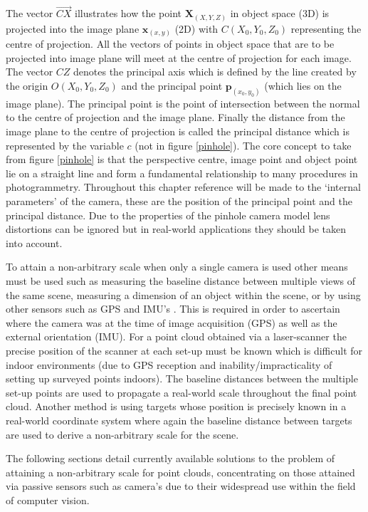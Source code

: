The vector $\vec{CX}$ illustrates how the point $\textbf{X}_{(X,Y,Z)}$ in object space (3D) is projected into the image plane $\textbf{x}_{(x,y)}$ (2D) with $C(X_0,Y_0,Z_0)$ representing the centre of projection. All the vectors of points in object space that are to be projected into image plane will meet at the centre of projection for each image. The vector $CZ$ denotes the principal axis which is defined by the line created by the origin $O(X_0,Y_0,Z_0)$ and the principal point $\textbf{p}_{(x_0,y_0)}$ (which lies on the image plane). The principal point is the point of intersection between the normal to the centre of projection and the image plane. Finally the distance from the image plane to the centre of projection is called the principal distance which is represented by the variable $c$ (not in figure \ref{pinhole}). The core concept to take from figure \ref{pinhole} is that the perspective centre, image point and object point lie on a straight line and form a fundamental relationship to many procedures in photogrammetry. Throughout this chapter reference will be made to the `internal parameters' of the camera, these are the position of the principal point and the principal distance. Due to the properties of the pinhole camera model lens distortions can be ignored but in real-world applications they should be taken into account.

To attain a non-arbitrary scale when only a single camera is used other means must be used such as measuring the baseline distance between multiple views of the same scene, measuring a dimension of an object within the scene, or by using other sensors such as GPS and IMU's \citep{scaramuzza_absolute_2009-1}. This is required in order to ascertain where the camera was at the time of image acquisition (GPS) as well as the external orientation (IMU). For a point cloud obtained via a laser-scanner the precise position of the scanner at each set-up must be known which is difficult for indoor environments (due to GPS reception and inability/impracticality of setting up surveyed points indoors). The baseline distances between the multiple set-up points are used to propagate a real-world scale throughout the final point cloud. Another method is using targets whose position is precisely known in a real-world coordinate system where again the baseline distance between targets are used to derive a non-arbitrary scale for the scene.

The following sections detail currently available solutions to the problem of attaining a non-arbitrary scale for point clouds, concentrating on those attained via passive sensors such as camera's due to their widespread use within the field of computer vision.

